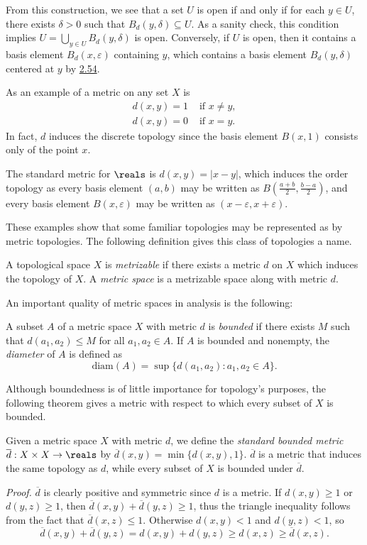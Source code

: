 From this construction, we see that a set $U$ is open if and only if for each $y \in U$, there exists $\delta > 0$ such that $B_d(y, \delta) \subseteq U$. As a sanity check, this condition implies $U = \bigcup_{y \in U} B_d(y, \delta)$ is open. Conversely, if $U$ is open, then it contains a basis element $B_d(x, \varepsilon)$ containing $y$, which contains a basis element $B_d(y, \delta)$ centered at $y$ by \hyperref[2.54]{2.54}.

As an example of a metric on any set $X$ is
\begin{align*}
    d(x, y) = 1 &\text{ if } x\neq y, \\
    d(x, y) = 0 &\text{ if } x=y.
\end{align*}
In fact, $d$ induces the discrete topology since the basis element $B(x, 1)$ consists only of the point $x$.

The standard metric for $\reals$ is $d(x, y) = |x-y|$, which induces the order topology as every basis element $(a, b)$ may be written as $B\left(\frac{a+b}{2}, \frac{b-a}{2}\right)$, and every basis element $B(x, \varepsilon)$ may be written as $(x-\varepsilon, x + \varepsilon)$.

These examples show that some familiar topologies may be represented as by metric topologies. The following definition gives this class of topologies a name.
\begin{definition}\label{2.55}
    A topological space $X$ is {\it metrizable} if there exists a metric $d$ on $X$ which induces the topology of $X$. A {\it metric space} is a metrizable space along with metric $d$.
\end{definition}
An important quality of metric spaces in analysis is the following:
\begin{definition}\label{2.56}
    A subset $A$ of a metric space $X$ with metric $d$ is {\it bounded} if there exists $M$ such that $d(a_1, a_2) \leq M$ for all $a_1, a_2 \in A$. If $A$ is bounded and nonempty, the {\it diameter} of $A$ is defined as
    $$\text{diam}(A) = \sup \{d(a_1, a_2): a_1, a_2 \in A\}.$$
\end{definition}

Although boundedness is of little importance for topology's purposes, the following theorem gives a metric with respect to which every subset of $X$ is bounded.
\begin{theorem}\label{2.57}
    Given a metric space $X$ with metric $d$, we define the {\it standard bounded metric} $\overline{d}: X \times X \rightarrow \reals$ by $\overline{d}(x, y) = \min \{d(x, y), 1\}$. $\overline{d}$ is a metric that induces the same topology as $d$, while every subset of $X$ is bounded under $\overline{d}$.
\end{theorem}
{\it Proof.} $\overline{d}$ is clearly positive and symmetric since $d$ is a metric. If $d(x, y) \geq 1$ or $d(y, z) \geq 1$, then $\overline{d}(x, y) + \overline{d}(y, z) \geq 1$, thus the triangle inequality follows from the fact that $\overline{d}(x, z) \leq 1$. Otherwise $d(x, y) < 1$ and $d(y, z) < 1$, so
$$\overline{d}(x, y) + \overline{d}(y, z) = d(x, y) + d(y, z) \geq d(x, z) \geq \overline{d}(x, z).$$

